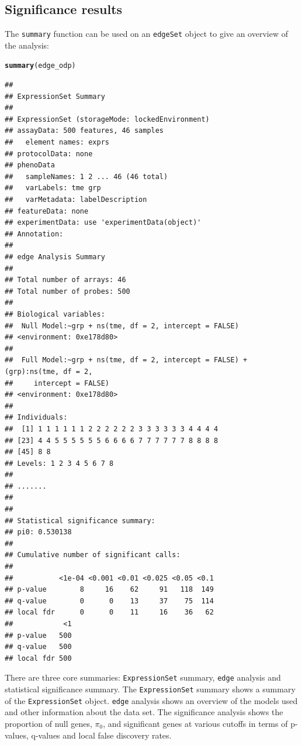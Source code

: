 \documentclass{article}\usepackage[]{graphicx}\usepackage[]{color}
\makeatletter
\newcommand{\hlstd}[1]{\textcolor[rgb]{0.345,0.345,0.345}{#1}}%
\newcommand{\hlkwd}[1]{\textcolor[rgb]{0.737,0.353,0.396}{\textbf{#1}}}%
\newenvironment{kframe}{%
 \def\at@end@of@kframe{}%
 \ifinner\ifhmode%
  \def\at@end@of@kframe{\end{minipage}}%
  \begin{minipage}{\columnwidth}%
 \fi\fi%
 \def\FrameCommand##1{\hskip\@totalleftmargin \hskip-\fboxsep
 \colorbox{shadecolor}{##1}\hskip-\fboxsep
     \hskip-\linewidth \hskip-\@totalleftmargin \hskip\columnwidth}%
 \MakeFramed {\advance\hsize-\width
   \@totalleftmargin\z@ \linewidth\hsize
   \@setminipage}}%
 {\par\unskip\endMakeFramed%
 \at@end@of@kframe}
\newenvironment{knitrout}{}{} %
\makeatother
\begin{document}
\subsection{Significance results}
The {\tt summary} function can be used on an {\tt edgeSet} object to give an overview of the analysis:

\begin{knitrout}
\color{fgcolor}\begin{kframe}
\begin{alltt}
\hlkwd{summary}\hlstd{(edge_odp)}
\end{alltt}
\begin{verbatim}
## 
## ExpressionSet Summary 
##  
## ExpressionSet (storageMode: lockedEnvironment)
## assayData: 500 features, 46 samples 
##   element names: exprs 
## protocolData: none
## phenoData
##   sampleNames: 1 2 ... 46 (46 total)
##   varLabels: tme grp
##   varMetadata: labelDescription
## featureData: none
## experimentData: use 'experimentData(object)'
## Annotation:  
## 
## edge Analysis Summary 
##  
## Total number of arrays: 46 
## Total number of probes: 500 
##  
## Biological variables: 
## 	Null Model:~grp + ns(tme, df = 2, intercept = FALSE)
## <environment: 0xe178d80>
## 
## 	Full Model:~grp + ns(tme, df = 2, intercept = FALSE) + (grp):ns(tme, df = 2, 
##     intercept = FALSE)
## <environment: 0xe178d80>
## 
## Individuals: 
##  [1] 1 1 1 1 1 1 2 2 2 2 2 2 3 3 3 3 3 3 4 4 4 4
## [23] 4 4 5 5 5 5 5 5 6 6 6 6 7 7 7 7 7 7 8 8 8 8
## [45] 8 8
## Levels: 1 2 3 4 5 6 7 8
## 
## ....... 
##  
## 
## Statistical significance summary:
## pi0:	0.530138	
## 
## Cumulative number of significant calls:
## 
##           <1e-04 <0.001 <0.01 <0.025 <0.05 <0.1
## p-value        8     16    62     91   118  149
## q-value        0      0    13     37    75  114
## local fdr      0      0    11     16    36   62
##            <1
## p-value   500
## q-value   500
## local fdr 500
\end{verbatim}
\end{kframe}
\end{knitrout}
There are three core summaries: {\tt ExpressionSet} summary, {\tt edge} analysis and statistical significance summary. The {\tt ExpressionSet} summary shows a summary of the {\tt ExpressionSet} object. {\tt edge} analysis shows an overview of the models used and other information about the data set. The significance analysis shows the proportion of null genes, $\pi_{0}$, and significant genes at various cutoffs in terms of p-values, q-values and local false discovery rates.
\end{document}
